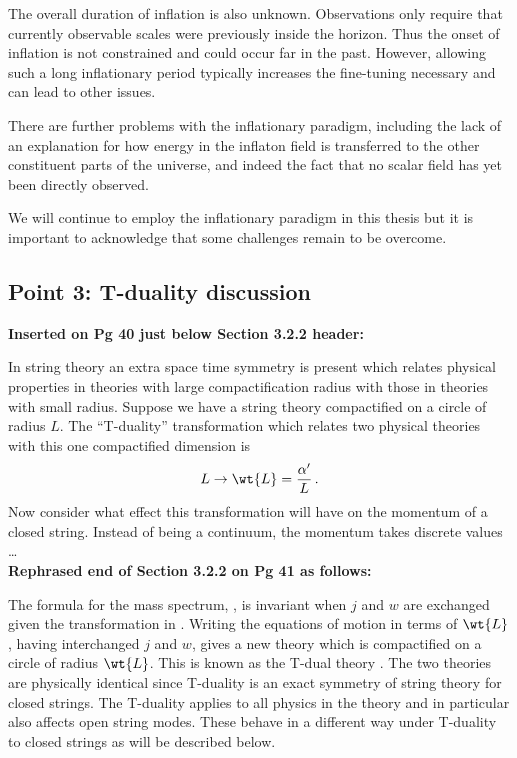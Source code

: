 The overall duration of inflation is also unknown. Observations only require that currently
observable scales were previously inside the horizon. Thus the onset of inflation is not
constrained and could occur far in the past. However, allowing such a long inflationary period
typically increases the fine-tuning necessary and can lead to other issues. 

There are further problems with the inflationary paradigm, including the lack of an explanation for
how energy in the inflaton field is transferred to the other constituent parts of the universe, and
indeed the fact that no scalar field has yet been directly observed.

We will continue to employ the inflationary paradigm in this thesis but it is important to
acknowledge that some challenges remain to be overcome.

\subsection{Point 3: T-duality discussion}
\textbf{Inserted on Pg 40 just below Section 3.2.2 header:}

In string theory an extra space time symmetry is present which relates physical properties in
theories with large compactification radius with those in theories with small radius. 
Suppose we have a string theory compactified on a circle of radius $L$. The ``T-duality''
transformation which relates two physical theories with this one compactified dimension is
% 
\begin{equation}
\label{eq:tdualtransform-corr}
 L \rightarrow \wt{L} = \frac{\alpha'}{L}\,.
\end{equation}
% 
Now consider what effect this transformation will have on the momentum of a closed string. Instead
of being a continuum, the momentum takes discrete values \ldots
\\

\textbf{Rephrased end of Section 3.2.2 on Pg 41 as follows:}

The formula for the mass spectrum, , is invariant
when $j$ and $w$ are exchanged given the transformation in .
Writing the equations of motion in terms of $\wt{L}$, having interchanged $j$ and
$w$, gives a new theory which is compactified on a circle of radius $\wt{L}$. This is known as the
T-dual theory \cite{Sakai1986,Kikkawa1984b}. The two
theories are physically identical since T-duality is an exact symmetry
of string theory for closed strings. The T-duality applies to all physics in the theory and in
particular also affects open string modes. These behave in a different way under T-duality to closed
strings as will be described below.
\\

